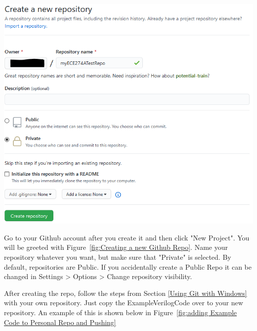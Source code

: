 \documentclass[12pt]{article}
\begin{document}
\begin{center}
    \includegraphics[scale=0.8]{git_test_0.PNG}
    \label{fig:Creating a new Github Repo}
\end{center}

Go to your Github account after you create it and then click "New Project". You will be greeted with Figure~\ref{fig:Creating a new Github Repo}. Name your repository whatever you want, but make sure that "Private" is selected. By default, repositories are Public. If you accidentally create a Public Repo it can be changed in Settings > Options > Change repository visibility.

After creating the repo, follow the steps from Section \ref{Using Git with Windows} with your own repository. Just copy the ExampleVerilogCode over to your new repository. An example of this is shown below in Figure~\ref{fig:adding Example Code to Personal Repo and Pushing}
\end{document}
